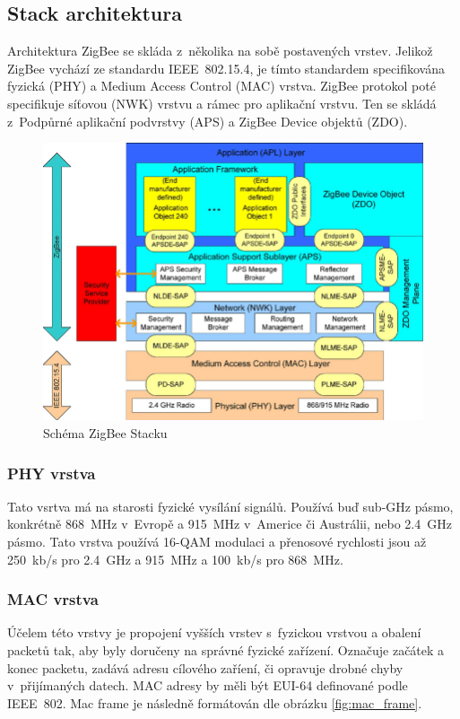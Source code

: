 \documentclass[a4paper,10pt,titlepage]{article}
\begin{document}
\subsection{Stack architektura} \label{sec:stack}
Architektura ZigBee se skláda z~několika na sobě postavených vrstev. Jelikož ZigBee vychází ze standardu IEEE~802.15.4, je tímto standardem specifikována fyzická (PHY) a Medium Access Control (MAC) vrstva. ZigBee protokol poté specifikuje síťovou (NWK) vrstvu a rámec pro aplikační vrstvu. Ten se skládá z~Podpůrné aplikační podvrstvy (APS) a ZigBee Device objektů (ZDO).~\cite{zigbee-spec23}

\begin{figure}[h] \label{fig:zb_stack}
	\centering
	\includegraphics[width=\textwidth]{assets/stack_architecture.png}
	\caption[Schéma ZigBee Stacku]{Schéma ZigBee Stacku~\cite{5173521}}
\end{figure}

\subsubsection{PHY vrstva} \label{sec:PHY}
Tato vsrtva má na starosti fyzické vysílání signálů. Používá buď sub-GHz pásmo, konkrétně  868~MHz v~Evropě a 915~MHz v~Americe či Austrálii, nebo 2.4~GHz pásmo. Tato vrstva používá 16-QAM modulaci a přenosové rychlosti jsou až 250~kb/s pro 2.4~GHz a 915~MHz a 100~kb/s pro 868~MHz.\cite{ieee-802-15-4}

\subsubsection{MAC vrstva} \label{sec:MAC}
Účelem této vrstvy je propojení vyšších vrstev s~fyzickou vrstvou a obalení packetů tak, aby byly doručeny na správné fyzické zařízení. Označuje začátek a konec packetu, zadává adresu cílového zaříení, či opravuje drobné chyby v~přijímaných datech. MAC adresy by měli být EUI-64 definované podle IEEE~802. Mac frame je následně formátován dle obrázku \ref{fig:mac_frame}.~\cite{5173521}
\end{document}
